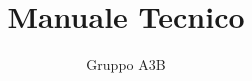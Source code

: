 \subject{Progetto Climate Monitoring}
\title{Manuale Tecnico}
\subtitle{}
\author{Gruppo A3B}
\date{\ISOToday ~ \thistime}
